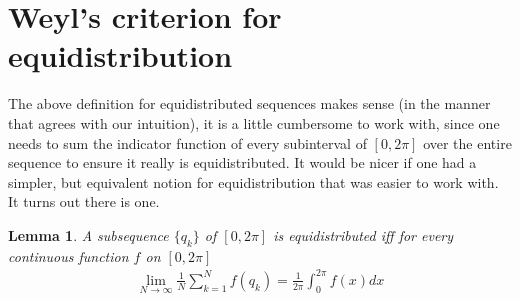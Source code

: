 \documentclass[12pt]{article}
\newtheorem{lem}[thm]{Lemma}
\theoremstyle{definition}
\begin{document}
\section{Weyl's criterion for equidistribution}
The above definition for equidistributed sequences makes sense (in the manner that agrees with our intuition), it is a little cumbersome to work with, since one needs to sum the indicator function of every subinterval of $[0,2\pi]$ over the entire sequence to ensure it really is equidistributed. It would be nicer if one had a simpler, but equivalent notion for equidistribution that was easier to work with. It turns out there is one.

\begin{lem} \label{lem:1}
    A subsequence $\{q_k\}$ of $[0,2\pi]$ is equidistributed iff for every continuous function $f$ on $[0,2\pi]$
    \begin{align*}
        \lim\limits_{N \to \infty} \frac{1}{N} \sum_{k=1}^{N} f(q_k) = \frac{1}{2\pi} \int_{0}^{2\pi} f(x)dx
    \end{align*}
\end{lem}
\end{document}
